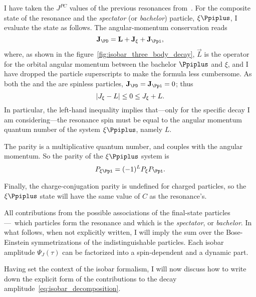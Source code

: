     I have taken the $J^{PC}$ values of the previous resonances from~\cite{chinese_phisics}.
    For the composite state of the resonance and the \emph{spectator} (or \emph{bachelor}) particle, $\xi\Ppiplus$, I evaluate the state as follows. 
    The angular-momentum conservation reads
    \begin{equation}
        \vec{J}_{\PD} = \vec{L} + \vec{J}_{\xi} + \vec{J}_{\Ppi},
    \end{equation}
    where, as shown in the figure~\ref{fig:isobar_three_body_decay}, $\vec{L}$ is the operator for the orbital angular momentum between the bachelor $\Ppiplus$ and $\xi$, and I have dropped the particle superscripts to make the formula less cumbersome.
    As both the \Ppiplus{} and the \PDplus are spinless particles, $\vec{J}_{\PD} = \vec{J}_{\Ppi} = 0$; thus
    \begin{equation}
        \lvert J_{\xi} - L\rvert \le 0 \le J_{\xi} + L.
    \end{equation}
    In particular, the left-hand inequality implies that---only for the specific decay I am considering---the resonance spin must be equal to the angular momentum quantum number of the system $\xi\Ppiplus$, namely $L$.


    The parity is a multiplicative quantum number, and couples with the angular momentum.
    So the parity of the $\xi\Ppiplus$ system is
    \begin{equation}
        P_{\xi\Ppi} = (-1)^L P_{\xi} P_{\Ppi}.
    \end{equation}


    Finally, the charge-conjugation parity is undefined for charged particles, so the $\xi\Ppiplus$ state will have the same value of $C$ as the resonance's. 


    {\color{red}
    All contributions from the possible associations of the final-state particles---\ie~which particles form the resonance and which is the \emph{spectator}, or \emph{bachelor}.
    In what follows, when not explicitly written, I will imply the sum over the Bose-Einstein symmetrizations of the indistinguishable \Ppiplus{} particles.
    Each isobar amplitude $\Psi_J(\tau)$ can be factorized into a spin-dependent and a dynamic part.
    }

    Having set the context of the isobar formalism, I will now discuss how to write down the explicit form of the contributions to the decay amplitude~\eqref{eq:isobar_decomposition}.

